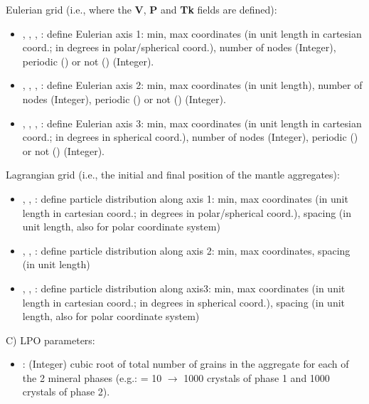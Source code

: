 \vspace{0.2cm}

Eulerian grid (i.e., where the \textbf{V}, \textbf{P} and \textbf{Tk} fields are defined):
\begin{itemize}

    \item {}, , , : define Eulerian axis 1: min, max coordinates (in unit length in cartesian coord.; in degrees in polar/spherical coord.), number of nodes (Integer), periodic () or not () (Integer).  
    \item {}, , , : define Eulerian axis 2: min, max coordinates (in unit length), number of nodes (Integer), periodic () or not () (Integer).  
    \item {}, , , : define Eulerian axis 3: min, max coordinates (in unit length in cartesian coord.; in degrees in spherical coord.), number of nodes (Integer), periodic () or not () (Integer).  
\end{itemize}

\vspace{0.2cm}
Lagrangian grid (i.e., the initial and final position of the mantle aggregates):
 
\begin{itemize}   
    \item {}, , : define particle distribution along axis 1: min, max coordinates (in unit length in cartesian coord.; in degrees in polar/spherical coord.), spacing (in unit length, also for polar coordinate system)
    \item {}, , : define particle distribution along axis 2: min, max coordinates, spacing (in unit length)
    \item {}, , : define particle distribution along axis3: min, max coordinates (in unit length in cartesian coord.; in degrees in spherical coord.), spacing (in unit length, also for polar coordinate system)
\end{itemize}
\vspace{1cm}



C) LPO parameters:
\begin{itemize}
    \item {}\footnotemark: (Integer) cubic root of total number of grains in the aggregate for each of the 2 mineral phases (e.g.:  = 10 $\rightarrow$ 1000 crystals of phase 1 and 1000 crystals of phase 2). 
\end{itemize}
\vspace{0.5cm}

